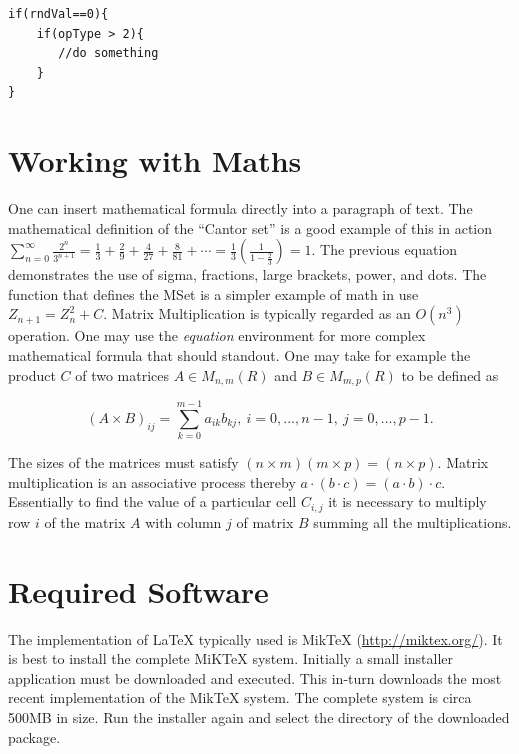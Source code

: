 \break



\begin{lstlisting}[caption=Sample Program Code Listing, label=code:SampleCode]
if(rndVal==0){
    if(opType > 2){
       //do something
    }
}
\end{lstlisting}





\section{Working with Maths}
One can insert mathematical formula directly into a paragraph of text. The mathematical definition of the ``Cantor set'' is a good example of this in action
$\displaystyle\sum_{n=0}^\infty \frac{2^n}{3^{n+1}} = \frac{1}{3} +
\frac{2}{9} + \frac{4}{27} + \frac{8}{81} + \cdots =
\frac{1}{3}\left(\frac{1}{1-\frac{2}{3}}\right) = 1$. The previous equation demonstrates the use of sigma, fractions, large brackets, power, and dots. The function that defines the MSet is a simpler example of math in use $Z_{n+1} =
Z_{n}^2 + C$. Matrix Multiplication is typically regarded as an $O(n^3)$
operation. One may use the \emph{equation} environment for more complex mathematical formula that should standout. One may take for example the product  $C$ of two matrices $A \in M_{n,m}(R)$ and $B \in
M_{m,p}(R)$ to be defined as

\begin{equation}
(A \times B)_{ij} = \sum_{k=0} ^{m-1} a_{ik}b_{kj},~
i=0,...,n-1,~j=0,...,p-1.
\end{equation}

The sizes of the matrices must satisfy $(n \times m)(m \times p) =
(n \times p)$. Matrix multiplication is an associative process
thereby $a\cdot(b \cdot c) = (a \cdot b) \cdot c$. Essentially to
find the value of a particular cell $C_{i,j}$ it is necessary to
multiply row $i$ of the matrix $A$ with column $j$ of matrix $B$
summing all the multiplications.


\section{Required Software}

The implementation of \LaTeX \hspace{2 pt} typically used is MikTeX (\url{http://miktex.org/}). It is best to install the complete MiKTeX  system. Initially a small installer application must be downloaded and executed. This in-turn downloads the most recent implementation of the MikTeX system. The complete system is circa 500MB in size. Run the installer again and select the directory of the downloaded package.

